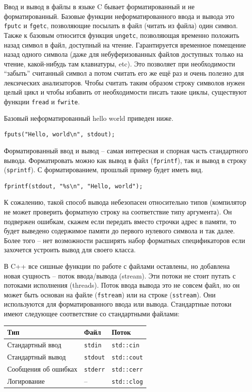 \documentclass[a4paper,12pt,oneside]{book}
\begin{document}
Ввод и вывод в файлы в языке C бывает форматированный и не форматированный. Базовые функции неформатированного ввода и вывода это \lstinline!fputc! и \lstinline!fgetc!, позволяющие посылать в файл (читать из файла) один символ. Также к базовым относится функция \lstinline!ungetc!, позволяющая временно положить назад символ в файл, доступный на чтение. Гарантируется временное помещение назад одного символа (даже для небуферизованных файлов доступных только на чтение, какой-нибудь там клавиатуры, etc). Это позволяет при необходимости ``забыть'' считанный символ а потом считать его же ещё раз и очень полезно для лексических анализаторов. Чтобы считать таким образом строку символов нужен целый цикл и чтобы избавить от необходимости писать такие циклы, существуют функции \lstinline!fread! и \lstinline!fwrite!. 

Базовый неформатированный hello world приведен ниже.

\begin{lstlisting}
fputs("Hello, world\n", stdout);
\end{lstlisting}

Форматированный ввод и вывод -- самая интересная и спорная часть стандартного вывода. Форматировать можно как вывод в файл (\lstinline!fprintf!), так и вывод в строку (\lstinline!sprintf!). С форматированием, прошлый пример будет иметь вид.

\begin{lstlisting}
fprintf(stdout, "%s\n", "Hello, world");
\end{lstlisting}

К сожалению, такой способ вывода небезопасен относительно типов (компилятор не может проверить форматную строку на соответствие типу аргумента). Он подвержен ошибкам, скажем если передать вместо строчки адрес в памяти, то будет выведено содержимое памяти до первого нулевого символа и так далее. Более того -- нет возможности расширять набор форматных спецификаторов если захочется устроить вывод для своего класса.

В C++ все сишные функции по работе с файлами оставлены, но добавлена новая сущность -- поток ввода/вывода (stream). Эти потоки не стоит путать с потоками исполнения (threads). Поток ввода вывода это не совсем файл, но он может быть основан на файле (\lstinline!fstream!) или на строке (\lstinline!sstream!). Они используются для форматированного ввода или вывода. Стандартные потоки имеют следующее соответствие со стандартными файлами:

\begin{center}
\begin{tabular}{ | l | l | l | }
  \hline
  Тип & Файл & Поток \\ \hline
  Стандартный ввод & \lstinline!stdin! & \lstinline!std::cin! \\
  Стандартный вывод & \lstinline!stdout! & \lstinline!std::cout! \\
  Сообщения об ошибках & \lstinline!stderr! & \lstinline!std::cerr! \\
  Логирование & -- & \lstinline!std::clog! \\
  \hline
\end{tabular}
\end{center}
\end{document}
